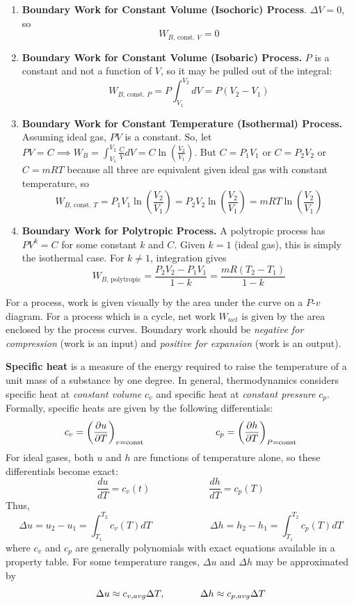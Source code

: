 \begin{shaded}
    \begin{enumerate}
        \item \textbf{Boundary Work for Constant Volume (Isochoric) Process}. $\Delta V = 0$, so \[W_{B\text{, const. }V} = 0\]
        \item \textbf{Boundary Work for Constant Volume (Isobaric) Process.} $P$ is a constant and not a function of $V$, so it may be pulled out of the integral: \[W_{B\text{, const. }P} = P\int_{V_1}^{V_2} dV = P(V_2-V_1)\]
        \item \textbf{Boundary Work for Constant Temperature (Isothermal) Process.} Assuming ideal gas, $PV$ is a constant. So, let $PV=C\implies W_B = \int_{V_1}^{V_2}\frac{C}{V}dV = C\ln\left(\frac{V_2}{V_1}\right)$. But $C=P_1V_1$ or $C=P_2V_2$ or $C=mRT$ because all three are equivalent given ideal gas with constant temperature, so \[W_{B\text{, const. }T} = P_1V_1 \ln\left(\frac{V_2}{V_1}\right) = P_2V_2 \ln\left(\frac{V_2}{V_1}\right) = mRT \ln\left(\frac{V_2}{V_1}\right)\]
        \item \textbf{Boundary Work for Polytropic Process.} A polytropic process has $PV^k = C$ for some constant $k$ and $C$. Given $k=1$ (ideal gas), this is simply the isothermal case. For $k\neq 1$, integration gives \[W_{B\text{, polytropic}} = \frac{P_2V_2 - P_1V_1}{1-k} = \frac{mR(T_2 - T_1)}{1-k}\]
    \end{enumerate}
\end{shaded}

For a process, work is given visually by the area under the curve on a $P$-$v$ diagram. For a process which is a cycle, net work $W_{net}$ is given by the area enclosed by the process curves. Boundary work should be \textit{negative for compression} (work is an input) and \textit{positive for expansion} (work is an output).

\textbf{Specific heat} is a measure of the energy required to raise the temperature of a unit mass of a substance by one degree. In general, thermodynamics considers specific heat at \textit{constant volume} $c_v$ and specific heat at \textit{constant pressure} $c_p$. Formally, specific heats are given by the following differentials:
\[c_v = \left(\frac{\partial u}{\partial T}\right)_{v=\text{const}}\hspace{1in}c_p = \left(\frac{\partial h}{\partial T}\right)_{P=\text{const}}\]
For ideal gases, both $u$ and $h$ are functions of temperature alone, so these differentials become exact: \[\frac{du}{dT} = c_v(t)\hspace{1in} \frac{dh}{dT} = c_p(T)\] Thus, \[\Delta u = u_2 - u_1 = \int_{T_1}^{T_2}c_v(T)dT\hspace{1in}\Delta h = h_2 - h_1 = \int_{T_1}^{T_2}c_p(T)dT\]
where $c_v$ and $c_p$ are generally polynomials with exact equations available in a property table. For some temperature ranges, $\Delta u$ and $\Delta h$ may be approximated by
\[ \Delta u \approx c_{v,avg}\Delta T,\hspace{0.5in}\Delta h \approx c_{p,avg}\Delta T\]

